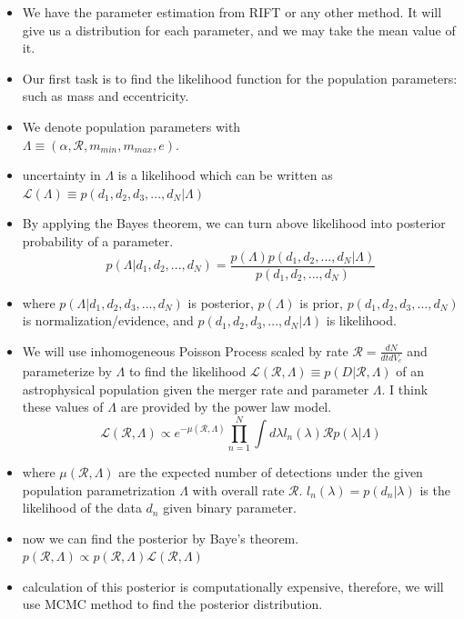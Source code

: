 \documentclass[twocolumn,prd,nofootinbib]{revtex4}
\begin{document}
\begin{itemize}
    \item We have the parameter estimation from RIFT or any other method. It will give us a distribution for each parameter, and we may take the mean value of it.
    \item Our first task is to find the likelihood function for the population parameters: such as mass and eccentricity.
    \item We denote population parameters with \\ $\Lambda \equiv  (\alpha, \mathcal{R}, m_{min}, m_{max}, e)$.
    \item uncertainty in $\Lambda$ is a likelihood which can be written as $\mathcal{L}(\Lambda)\equiv p(d_1,d_2,d_3,...,d_N|\Lambda)$
    \item By applying the Bayes theorem, we can turn above likelihood into posterior probability of a parameter.
\begin{equation}
\label{eq:Bayes}    
p(\Lambda|d_1,d_2,...,d_N)= \frac{p(\Lambda)p(d_1,d_2,...,d_N|\Lambda)}{p(d_1,d_2,...,d_N)}
\end{equation}

    \item where $p(\Lambda|d_1,d_2,d_3,...,d_N)$ is posterior, $p(\Lambda)$ is prior, $p(d_1,d_2,d_3,...,d_N)$ is normalization/evidence, and $p(d_1,d_2,d_3,...,d_N|\Lambda)$ is likelihood.
    \item We will use inhomogeneous Poisson Process scaled by rate $\mathcal{R} = \frac{dN}{dtdV_c}$ and parameterize by $\Lambda$ to find the likelihood  $\mathcal{L}(\mathcal{R},\Lambda)\equiv p(D|\mathcal{R},\Lambda)$ of an astrophysical population given the merger rate and parameter $\Lambda$. 
    {\color{red}I think these values of $\Lambda$ are provided by the power law model}. \\
\begin{equation}
\label{eq: likelihood}
\mathcal{L}(\mathcal{R},\Lambda) \propto e^{-\mu(\mathcal{R},\Lambda)}\prod_{n=1}^N\int d\lambda l_n(\lambda) \mathcal{R} p(\lambda|\Lambda)    
\end{equation}
        
    \item where $\mu(\mathcal{R},\Lambda)$ are the expected number of detections under the given population parametrization $\Lambda$ with overall rate $\mathcal{R}$. $l_n(\lambda)=p(d_n|\lambda)$ is the likelihood of the data $d_n$ given binary parameter.
    \item now we can find the posterior by Baye's theorem. \\
    $p(\mathcal{R},\Lambda)\propto p(\mathcal{R},\Lambda)  \mathcal{L}(\mathcal{R},\Lambda)$
    \item calculation of this posterior is computationally expensive, therefore, we will use MCMC method to find the posterior distribution.
    
\end{itemize}
\end{document}
